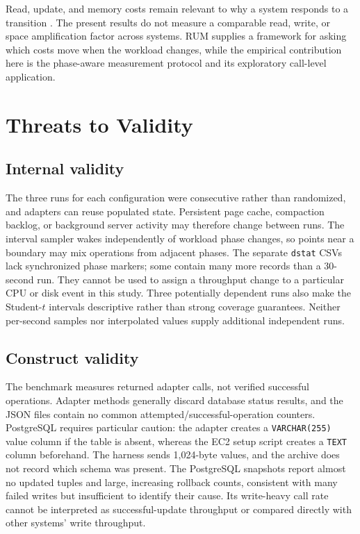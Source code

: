 \documentclass[10pt]{article}
\begin{document}
Read, update, and memory costs remain relevant to why a system responds to a transition \cite{athanassoulis2016}. The present results do not measure a comparable read, write, or space amplification factor across systems. RUM supplies a framework for asking which costs move when the workload changes, while the empirical contribution here is the phase-aware measurement protocol and its exploratory call-level application.

\section{Threats to Validity}
\label{sec:threats}
\subsection{Internal validity}
The three runs for each configuration were consecutive rather than randomized, and adapters can reuse populated state. Persistent page cache, compaction backlog, or background server activity may therefore change between runs. The interval sampler wakes independently of workload phase changes, so points near a boundary may mix operations from adjacent phases. The separate \texttt{dstat} CSVs lack synchronized phase markers; some contain many more records than a 30-second run. They cannot be used to assign a throughput change to a particular CPU or disk event in this study. Three potentially dependent runs also make the Student-$t$ intervals descriptive rather than strong coverage guarantees. Neither per-second samples nor interpolated values supply additional independent runs.

\subsection{Construct validity}
The benchmark measures returned adapter calls, not verified successful operations. Adapter methods generally discard database status results, and the JSON files contain no common attempted/successful-operation counters. PostgreSQL requires particular caution: the adapter creates a \texttt{VARCHAR(255)} value column if the table is absent, whereas the EC2 setup script creates a \texttt{TEXT} column beforehand. The harness sends 1,024-byte values, and the archive does not record which schema was present. The PostgreSQL snapshots report almost no updated tuples and large, increasing rollback counts, consistent with many failed writes but insufficient to identify their cause. Its write-heavy call rate cannot be interpreted as successful-update throughput or compared directly with other systems' write throughput.
\end{document}
